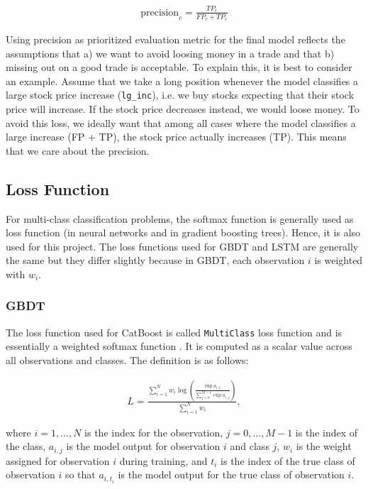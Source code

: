 \documentclass{article}
\begin{document}
	\begin{align}
	\mathrm{precision}_c = \frac{TP_c}{FP_c + TP_c}
	\end{align}
	
	Using precision as prioritized evaluation metric for the final model reflects the assumptions that a) we want to avoid loosing money in a trade and that b) missing out on a good trade is acceptable. To explain this, it is best to consider an example. Assume that we take a long position whenever the model classifies a large stock price increase (\verb|lg_inc|), i.e. we buy stocks expecting that their stock price will increase. If the stock price decreases instead, we would loose money. To avoid this loss, we ideally want that among all cases where the model classifies a large increase (FP + TP), the stock price actually increases (TP). This means that we care about the precision. 

	
	\subsection{Loss Function}
	
	For multi-class classification problems, the softmax function is generally used as loss function (in neural networks and in gradient boosting trees). Hence, it is also used for this project. The loss functions used for GBDT and LSTM are generally the same but they differ slightly because in GBDT, each observation $i$ is weighted with $w_i$.
	
	\subsubsection{GBDT}
	
	The loss function used for CatBoost is called \lstinline{MultiClass} loss function and is essentially a weighted softmax function \cite{noauthor_multiclassification:_nodate}. It is computed as a scalar value across all observations and classes. The definition is as follows:
	
	\begin{align}
	L = \frac{\sum_{i = 1}^N w_i \log \left(\frac{\exp a_{i, t_i}}{\sum_{j = 0}^{M-1} \exp a_{i, j}}\right)}{\sum_{i = 1}^N w_i}, 
	\end{align}
	
	where $i = 1, ..., N$ is the index for the observation, $j = 0, ..., M-1$ is the index of the class, $a_{i, j}$ is the model output for observation $i$ and class $j$, $w_i$ is the weight assigned for observation $i$ during training, and $t_i$ is the index of the true class of observation $i$ so that $a_{i, t_i}$ is the model output for the true class of observation $i$.
	
\end{document}
